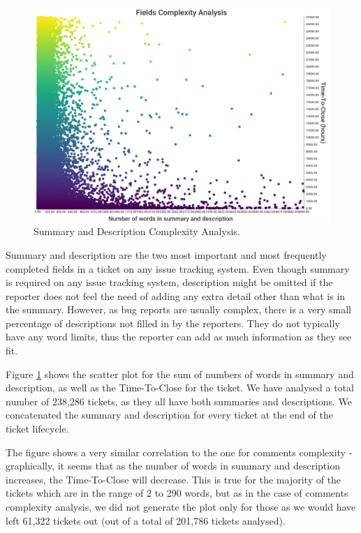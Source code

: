 \documentclass{mpaper}
\begin{document}
\begin{figure}[ht]
  \begin{center}
    \includegraphics[scale=0.18]{images/fields_complexity.png}
  \end{center}
  \caption{\label{fields}Summary and Description Complexity Analysis.}
\end{figure}

Summary and description are the two most important and most frequently completed fields in a ticket on any
issue tracking system. Even though summary is required on any issue tracking system, description might 
be omitted if the reporter does not feel the need of adding any extra detail other than what is in the summary. 
However, as bug reports are usually complex, there is a very small percentage of descriptions not filled in 
by the reporters. They do not typically have any word limits, thus the reporter can add as much information as 
they see fit.

Figure \ref{fields} shows the scatter plot for the sum of numbers of words in summary and description, as well 
as the Time-To-Close for the ticket. We have analysed a total number of 238,286 tickets, as they all have both 
summaries and descriptions. We concatenated the summary and description for every ticket at the end of the ticket 
lifecycle.

The figure shows a very similar correlation to the one for comments complexity - graphically, it seems that as the number of words 
in summary and description increases, the Time-To-Close will decrease. This is true for the majority of the tickets 
which are in the range of 2 to 290 words, but as in the case of comments complexity analysis, we did not generate 
the plot only for those as we would have left 61,322 tickets out (out of a total of 201,786 tickets analysed). 
\end{document}

